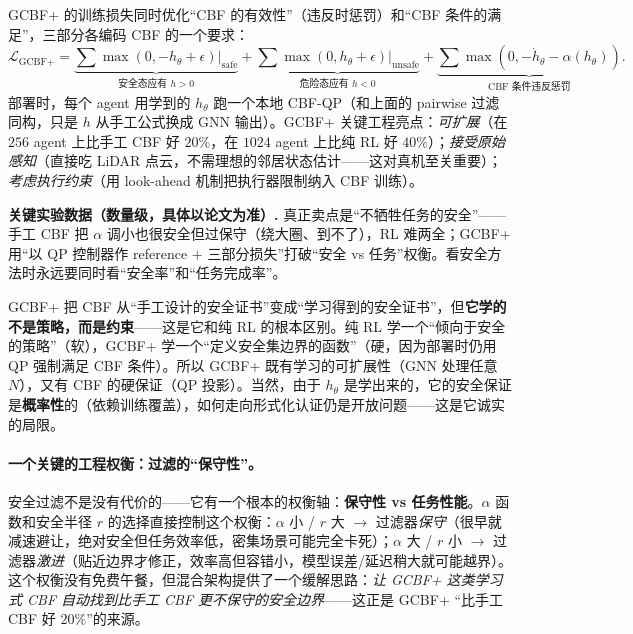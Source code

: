 \noindent GCBF+ 的训练损失同时优化“CBF 的有效性”（违反时惩罚）和“CBF 条件的满足”，三部分各编码 CBF 的一个要求\cite{zhang2025gcbfplus}：
\begin{equation}
  \mathcal{L}_{\text{GCBF+}}=\underbrace{\textstyle\sum\max(0,-h_\theta+\epsilon)\big|_{\text{safe}}}_{\text{安全态应有 }h>0}+\underbrace{\textstyle\sum\max(0,h_\theta+\epsilon)\big|_{\text{unsafe}}}_{\text{危险态应有 }h<0}+\underbrace{\textstyle\sum\max(0,-\dot h_\theta-\alpha(h_\theta))}_{\text{CBF 条件违反惩罚}}.
  \label{eq:mh-gcbf-loss}
\end{equation}
部署时，每个 agent 用学到的 $h_\theta$ 跑一个本地 CBF-QP（和上面的 pairwise 过滤同构，只是 $h$ 从手工公式换成 GNN 输出）。GCBF+ 关键工程亮点：\emph{可扩展}（在 $256$ agent 上比手工 CBF 好 $20\%$，在 $1024$ agent 上比纯 RL 好 $40\%$）；\emph{接受原始感知}（直接吃 LiDAR 点云，不需理想的邻居状态估计——这对真机至关重要）；\emph{考虑执行约束}（用 look-ahead 机制把执行器限制纳入 CBF 训练）。

\begin{note}
\textbf{关键实验数据（数量级，具体以论文为准）.}\;
真正卖点是“不牺牲任务的安全”——手工 CBF 把 $\alpha$ 调小也很安全但过保守（绕大圈、到不了），RL 难两全；GCBF+ 用“以 QP 控制器作 reference $+$ 三部分损失”打破“安全 vs 任务”权衡。看安全方法时永远要同时看“安全率”和“任务完成率”。
\end{note}

\begin{insight}
GCBF+ 把 CBF 从“手工设计的安全证书”变成“学习得到的安全证书”，但\textbf{它学的不是策略，而是约束}——这是它和纯 RL 的根本区别。纯 RL 学一个“倾向于安全的策略”（软），GCBF+ 学一个“定义安全集边界的函数”（硬，因为部署时仍用 QP 强制满足 CBF 条件）。所以 GCBF+ 既有学习的可扩展性（GNN 处理任意 $N$），又有 CBF 的硬保证（QP 投影）。当然，由于 $h_\theta$ 是学出来的，它的安全保证是\textbf{概率性}的（依赖训练覆盖），如何走向形式化认证仍是开放问题——这是它诚实的局限。
\end{insight}

\paragraph{一个关键的工程权衡：过滤的“保守性”。}
安全过滤不是没有代价的——它有一个根本的权衡轴：\textbf{保守性 vs 任务性能}。$\alpha$ 函数和安全半径 $r$ 的选择直接控制这个权衡：$\alpha$ 小 / $r$ 大 $\to$ 过滤器\emph{保守}（很早就减速避让，绝对安全但任务效率低，密集场景可能完全卡死）；$\alpha$ 大 / $r$ 小 $\to$ 过滤器\emph{激进}（贴近边界才修正，效率高但容错小，模型误差/延迟稍大就可能越界）。这个权衡没有免费午餐，但混合架构提供了一个缓解思路：\emph{让 GCBF+ 这类学习式 CBF 自动找到比手工 CBF 更不保守的安全边界}——这正是 GCBF+ “比手工 CBF 好 $20\%$”的来源。


